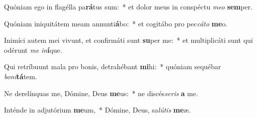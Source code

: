 \item Quóniam ego in flagélla pa\textbf{rá}tus sum:~* et dolor meus in conspéctu \textit{meo} \textbf{sem}per.
\item Quóniam iniquitátem meam annunti\textbf{á}bo:~* et cogitábo pro pec\textit{cáto} \textbf{me}o.
\item Inimíci autem mei vivunt, et confirmáti sunt \textbf{su}per me:~* et multiplicáti sunt qui odérunt \textit{me} \textit{in}\textbf{í}que.
\item Qui retríbuunt mala pro bonis, detrahébant \textbf{mi}hi:~* quóniam sequébar \textit{boni}\textbf{tá}tem.
\item Ne derelínquas me, Dómine, Deus \textbf{me}us:~* ne discés\tinyhspace\textit{seris} \textbf{a} me.
\item Inténde in adjutórium \textbf{me}um,~* Dómine, Deus, sa\textit{lútis} \textbf{me}æ.
